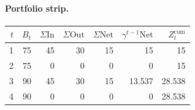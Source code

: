 \documentclass[12pt, a4paper]{article}
\begin{document}
\paragraph{Portfolio strip.}
\begin{center}
\begin{tabular}{rrrrrrr}
\toprule
$t$ & $B_t$ & $\Sigma\mathrm{In}$ & $\Sigma\mathrm{Out}$ & $\Sigma\mathrm{Net}$ & $\gamma^{t-1}\mathrm{Net}$ & $Z_t^{\mathrm{cum}}$\\
\midrule
1 & 75 & 45 & 30 & 15 & 15 & 15 \\
2 & 75 & 0 & 0 & 0 & 0 & 15 \\
3 & 90 & 45 & 30 & 15 & 13.537 & 28.538 \\
4 & 90 & 0 & 0 & 0 & 0 & 28.538 \\
\bottomrule
\end{tabular}
\end{center}
\end{document}
